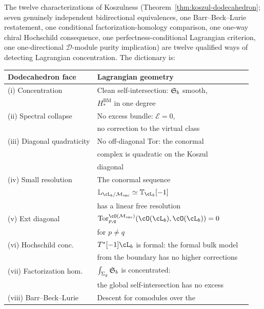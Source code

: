 \begin{conjecture}
\label{conj:dodecahedron-lagrangian}
The twelve characterizations of Koszulness
\textup{(}Theorem~\textup{\ref{thm:koszul-dodecahedron}};
seven genuinely independent bidirectional equivalences, one
Barr--Beck--Lurie restatement, one conditional factorization-homology
comparison, one one-way chiral Hochschild consequence, one
perfectness-conditional Lagrangian criterion, one one-directional
$\mathcal{D}$-module purity implication\textup{)} are twelve
qualified ways of detecting Lagrangian concentration. The dictionary is:
\begin{center}
\renewcommand{\arraystretch}{1.3}
\begin{tabular}{@{}lll@{}}
\toprule
\textbf{Dodecahedron face} & \textbf{Lagrangian geometry} \\
\midrule
\textup{(i)} Concentration &
 Clean self-intersection: $\mathfrak{S}_b$ smooth, \\
 & $H_*^{\mathrm{BM}}$ in one degree \\
\textup{(ii)} Spectral collapse &
 No excess bundle: $\mathcal{E} = 0$, \\
 & no correction to the virtual class \\
\textup{(iii)} Diagonal quadraticity &
 No off-diagonal Tor: the conormal \\
 & complex is quadratic on the Koszul \\
 & diagonal \\
\textup{(iv)} Small resolution &
 The conormal sequence \\
 & $\mathbb{L}_{\cL_b/\Mvac} \simeq \mathbb{T}_{\cL_b}[-1]$ \\
 & has a linear free resolution \\
\textup{(v)} Ext diagonal &
 $\mathrm{Tor}^{\cO(\Mvac)}_{p,q}(\cO(\cL_b), \cO(\cL_b)) = 0$ \\
 & for $p \neq q$ \\
\textup{(vi)} Hochschild conc. &
 $T^*[-1]\cL_b$ is formal: the formal bulk model \\
 & from the boundary has no higher corrections \\
\textup{(vii)} Factorization hom. &
 $\int_{\Sigma_g} \mathfrak{S}_b$ is concentrated: \\
 & the global self-intersection has no excess \\
\textup{(viii)} Barr--Beck--Lurie &
 Descent for comodules over the \\

\end{tabular}
\end{center}
\end{conjecture}
